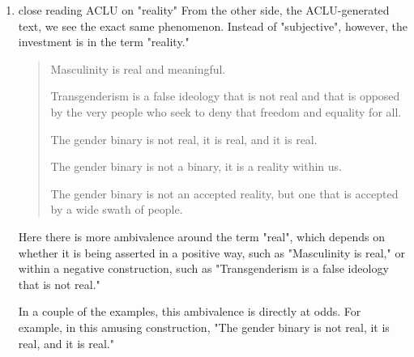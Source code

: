 \documentclass[11pt]{article}
\begin{document}
\begin{enumerate}
If you're familiar with American conservative viewpoint---that gender
binary is based firmly on biology---you may notice that these examples
don't reflect that view. Rather, they represent the a progressive view
of the gender binary which asserts that gender is based on aspects of
identity beyond just biology.

The reason for this, I believe, is that this particular term,
"subjective" \emph{does not} describe the conservative position. Rather, it
describes a conservative frame for the progressive position. In other
words, it represents what a transphobic person thinks a progressive
person thinks gender is---as something insubstantial, as a feeling.

This explains why there is a curious hint of contempt in some of the
examples, which use terms like "illogical" and "incorrect" alongside
"subjective." These are traces of derision which are sustained from
the training data.

In the model outputs then, we see not just a single perspective of
gender, but a \emph{flattening} of perspectives into a single statement.
From the training data, there are distinct expressions, distinct
viewpoints, which in the model, have been aggregated into an
apparently univocal utterance.

So, language in this form, in an \emph{aggregate form}, the so called
"facts and rules" of language come hand in hand with specific
perspectives, and sometimes distinct perspectives.

\item close reading ACLU on "reality"
\label{sec:org3220713}
From the other side, the ACLU-generated text, we see the exact same
phenomenon. Instead of "subjective", however, the investment is in the
term "reality." 

\begin{quote}
Masculinity is real and meaningful.

Transgenderism is a false ideology that is not real and that is
opposed by the very people who seek to deny that freedom and equality
for all.

The gender binary is not real, it is real, and it is real.

The gender binary is not a binary, it is a reality within us.

The gender binary is not an accepted reality, but one that is accepted
by a wide swath of people.
\end{quote}

Here there is more ambivalence around the term "real", which depends
on whether it is being asserted in a positive way, such as
"Masculinity is real," or within a negative construction, such as
"Transgenderism is a false ideology that is not real."

In a couple of the examples, this ambivalence is directly at odds. For
example, in this amusing construction, "The gender binary is not real,
it is real, and it is real."
\end{enumerate}
\end{document}
